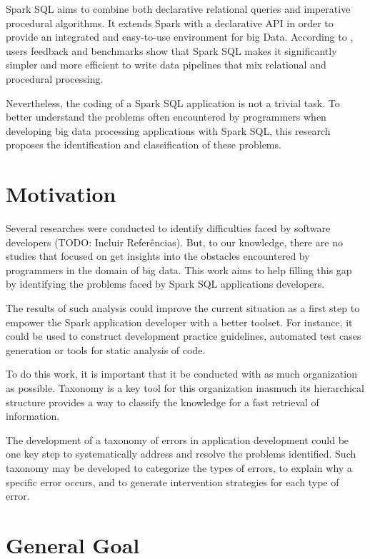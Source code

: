 Spark SQL aims to combine both declarative relational queries and imperative procedural algorithms. It extends Spark with a declarative API in order to provide an integrated and easy-to-use environment for big Data. According to \cite{armbrust2015sparksql}, users feedback and benchmarks show that Spark SQL makes it significantly simpler and more efficient to write data pipelines that mix relational and procedural processing. 

Nevertheless, the coding of a Spark SQL application is not a trivial task.
To better understand the problems often encountered by programmers when developing big data processing applications with Spark SQL, this research proposes the identification and classification of these problems.

\section{Motivation}

Several researches were conducted to identify difficulties faced by software developers (TODO: Incluir Referências). But, to our knowledge, there are no studies that focused on get insights into the obstacles encountered by programmers in the domain of big data. This work aims to help filling this gap by identifying the problems faced by Spark SQL applications developers.

The results of such analysis could improve the current situation as a first step to empower the Spark application developer with a better toolset.  For instance, it could be used to construct development practice guidelines, automated test cases generation or tools for static analysis of code.

To do this work, it is important that it be conducted with as much organization as possible. Taxonomy is a key tool for this organization inasmuch its hierarchical structure provides a way to classify the knowledge for a fast retrieval of information.

The development of a taxonomy of errors in application development could be one key step to systematically address and resolve the problems identified. Such taxonomy may be developed to categorize the types of errors, to explain why a specific error occurs, and to generate intervention strategies for each type of error.

\section{General Goal}

